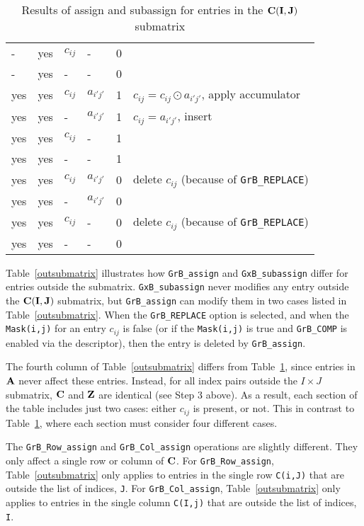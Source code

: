 \documentclass[12pt]{article}
\begin{document}
{\begin{table}
{\begin{tabular}{lllll|l}
    -  &yes & $c_{ij}$ &  -          & 0    &   \\
    -  &yes &  -       &  -          & 0    &   \\
\hline
    yes&yes & $c_{ij}$ & $a_{i'j'}$  & 1    &  $c_{ij} = c_{ij} \odot a_{i'j'}$, apply accumulator \\
    yes&yes &  -       & $a_{i'j'}$  & 1    &  $c_{ij} = a_{i'j'}$, insert \\
    yes&yes & $c_{ij}$ &  -          & 1    &   \\
    yes&yes &  -       &  -          & 1    &   \\
    yes&yes & $c_{ij}$ & $a_{i'j'}$  & 0    &  delete $c_{ij}$  (because of \verb'GrB_REPLACE') \\
    yes&yes &  -       & $a_{i'j'}$  & 0    &   \\
    yes&yes & $c_{ij}$ &  -          & 0    &  delete $c_{ij}$  (because of \verb'GrB_REPLACE') \\
    yes&yes &  -       &  -          & 0    &   \\
\hline
\end{tabular}
}
\caption{Results of assign and subassign for entries in the ${\bf C(I,J)}$ submatrix \label{insubmatrix}}
\end{table}

\newpage
Table~\ref{outsubmatrix} illustrates how \verb'GrB_assign' and
\verb'GxB_subassign' differ for entries outside the submatrix.
\verb'GxB_subassign' never modifies any entry outside the ${\bf C(I,J)}$
submatrix, but \verb'GrB_assign' can modify them in two cases listed in
Table~\ref{outsubmatrix}.  When the \verb'GrB_REPLACE' option is selected, and
when the \verb'Mask(i,j)' for an entry $c_{ij}$ is false (or if the
\verb'Mask(i,j)' is true and \verb'GrB_COMP' is enabled via the descriptor),
then the entry is deleted by \verb'GrB_assign'.

The fourth column of Table~\ref{outsubmatrix} differs from
Table~\ref{insubmatrix}, since entries in ${\bf A}$ never affect these entries.
Instead, for all index pairs outside the $I \times J$ submatrix, ${\bf C}$ and
${\bf Z}$ are identical (see Step 3 above).  As a result, each section of the
table includes just two cases: either $c_{ij}$ is present, or not.   This in
contrast to Table~\ref{insubmatrix}, where each section must consider four
different cases.

The \verb'GrB_Row_assign' and \verb'GrB_Col_assign' operations are slightly
different.  They only affect a single row or column of ${\bf C}$.
For \verb'GrB_Row_assign', Table~\ref{outsubmatrix} only applies to entries in
the single row \verb'C(i,J)' that are outside the list of indices, \verb'J'.
For \verb'GrB_Col_assign', Table~\ref{outsubmatrix} only applies to entries in
the single column \verb'C(I,j)' that are outside the list of indices, \verb'I'.

}
\end{document}
